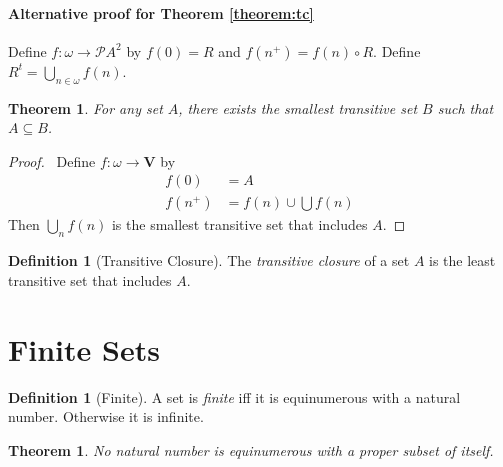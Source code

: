 \documentclass{article}
\let\qed\relax
\newtheorem{theorem}[axiom]{Theorem}
\theoremstyle{definition}
\newtheorem{definition}[axiom]{Definition}
\begin{document}
    \paragraph{Alternative proof for Theorem \ref{theorem:tc}}

    Define $f : \omega \rightarrow \mathcal{P} A^2$ by $f(0) = R$ and $f(n^+) = f(n) \circ R$. Define
    $R^t = \bigcup_{n \in \omega} f(n)$.

    \begin{theorem}
        For any set $A$, there exists the smallest transitive set $B$ such that $A \subseteq B$.
    \end{theorem}

    \begin{proof}
        \pf\ Define $f : \omega \rightarrow \mathbf{V}$ by
        \begin{align*}
            f(0) & = A \\
            f(n^+) & = f(n) \cup \bigcup f(n)
        \end{align*}
        Then $\bigcup_n f(n)$ is the smallest transitive set that includes $A$. \qed
    \end{proof}

    \begin{definition}[Transitive Closure]
        The \emph{transitive closure} of a set $A$ is the least transitive set that includes $A$.
    \end{definition}


    \section{Finite Sets}

    \begin{definition}[Finite]
        A set is \emph{finite} iff it is equinumerous with a natural number. Otherwise it is infinite.
    \end{definition}

    \begin{theorem}
        No natural number is equinumerous with a proper subset of itself.
    \end{theorem}
\end{document}
